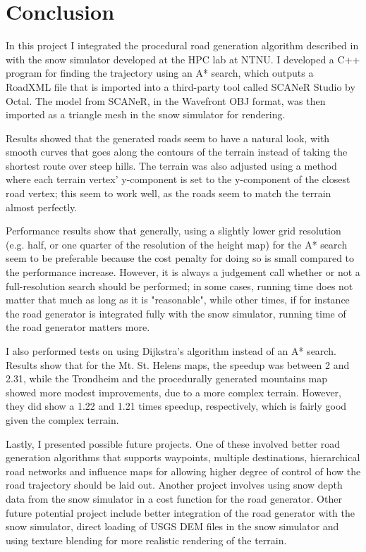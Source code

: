 \chapter{Conclusion}
\label{chap:conclusion}
In this project I integrated the procedural road generation algorithm described in \cite{roadgen} with the snow simulator developed at the HPC lab at NTNU. I developed a C++ program for finding the trajectory using an A* search, which outputs a RoadXML file that is imported into a third-party tool called SCANeR Studio by Octal. The model from SCANeR, in the Wavefront OBJ format, was then imported as a triangle mesh in the snow simulator for rendering.

Results showed that the generated roads seem to have a natural look, with smooth curves that goes along the contours of the terrain instead of taking the shortest route over steep hills. The terrain was also adjusted using a method where each terrain vertex' y-component is set to the y-component of the closest road vertex; this seem to work well, as the roads seem to match the terrain almost perfectly.

Performance results show that generally, using a slightly lower grid resolution (e.g. half, or one quarter of the resolution of the height map) for the A* search seem to be preferable because the cost penalty for doing so is small compared to the performance increase. However, it is always a judgement call whether or not a full-resolution search should be performed; in some cases, running time does not matter that much as long as it is "reasonable", while other times, if for instance the road generator is integrated fully with the snow simulator, running time of the road generator matters more. %

I also performed tests on using Dijkstra's algorithm instead of an A* search. Results show that for the Mt. St. Helens maps, the speedup was between 2 and 2.31, while the Trondheim and the procedurally generated mountains map showed more modest improvements, due to a more complex terrain. However, they did show a 1.22 and 1.21 times speedup, respectively, which is fairly good given the complex terrain.

Lastly, I presented possible future projects. One of these involved better road generation algorithms that supports waypoints, multiple destinations, hierarchical road networks and influence maps for allowing higher degree of control of how the road trajectory should be laid out. Another project involves using snow depth data from the snow simulator in a cost function for the road generator. Other future potential project include better integration of the road generator with the snow simulator, direct loading of USGS DEM files in the snow simulator and using texture blending for more realistic rendering of the terrain.
